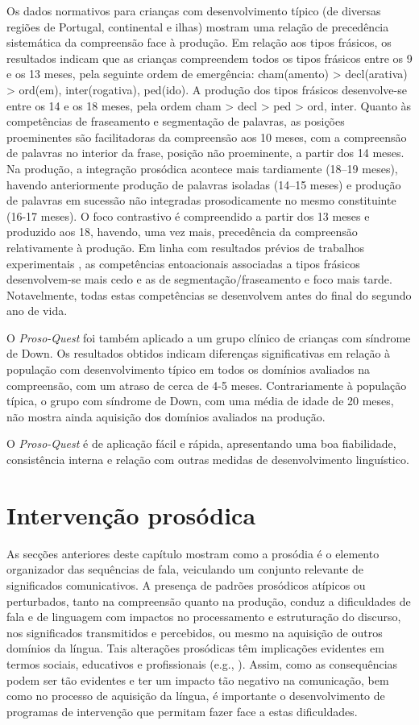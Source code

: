 \documentclass[output=paper,colorlinks,citecolor=brown,booklanguage=portuguese]{langscibook}
\begin{document}
Os dados normativos para crianças com desenvolvimento típico (de diversas regiões de Portugal, continental e ilhas) mostram uma relação de precedência sistemática da compreensão face à produção. Em relação aos tipos frásicos, os resultados indicam que as crianças compreendem todos os tipos frásicos entre os 9 e os 13 meses, pela seguinte ordem de emergência: cham(amento) > decl(arativa) > ord(em), inter(rogativa), ped(ido). A produção dos tipos frásicos desenvolve-se entre os 14 e os 18 meses, pela ordem cham > decl > ped > ord, inter. Quanto às competências de fraseamento e segmentação de palavras, as posições proeminentes são facilitadoras da compreensão aos 10 meses, com a compreensão de palavras no interior da frase, posição não proeminente, a partir dos 14 meses. Na produção, a integração prosódica acontece mais tardiamente (18--19 meses), havendo anteriormente produção de palavras isoladas (14--15 meses) e produção de palavras em sucessão não integradas prosodicamente no mesmo constituinte (16-17 meses). O foco contrastivo é compreendido a partir dos 13 meses e produzido aos 18, havendo, uma vez mais, precedência da compreensão relativamente à produção. Em linha com resultados prévios de trabalhos experimentais \citep{Frota2018}, as competências entoacionais associadas a tipos frásicos desenvolvem-se mais cedo e as de segmentação/fraseamento e foco mais tarde. Notavelmente, todas estas competências se desenvolvem antes do final do segundo ano de vida. 

O \emph{Proso-Quest} foi também aplicado a um grupo clínico de crianças com síndrome de Down. Os resultados obtidos indicam diferenças significativas em relação à população com desenvolvimento típico em todos os domínios avaliados na compreensão, com um atraso de cerca de 4-5 meses. Contrariamente à população típica, o grupo com síndrome de Down, com uma média de idade de 20 meses, não mostra ainda aquisição dos domínios avaliados na produção.

O \emph{Proso-Quest} é de aplicação fácil e rápida, apresentando uma boa fiabilidade, consistência interna e relação com outras medidas de desenvolvimento linguístico. 

\largerpage
\section{Intervenção prosódica}
As secções anteriores deste capítulo mostram como a prosódia é o elemento organizador das sequências de fala, veiculando um conjunto relevante de significados comunicativos. A presença de padrões prosódicos atípicos ou perturbados, tanto na compreensão quanto na produção, conduz a dificuldades de fala e de linguagem com impactos no processamento e estruturação do discurso, nos significados transmitidos e percebidos, ou mesmo na aquisição de outros domínios da língua. Tais alterações prosódicas têm implicações evidentes em termos sociais, educativos e profissionais (e.g., \citealp{Paul2005}). Assim, como as consequências podem ser tão evidentes e ter um impacto tão negativo na comunicação, bem como no processo de aquisição da língua, é importante o desenvolvimento de programas de intervenção que permitam fazer face a estas dificuldades.
\end{document}
